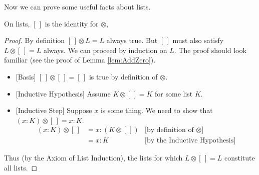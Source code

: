 \ipadbreak
Now we can prove some useful facts about lists.

\begin{lemma}
  On lists, $[\,]$ is the identity for $\otimes$,

\begin{proof}
  By definition
  $[\,]\otimes L = L$ always true.  But $[\,]$ must also 
  satisfy
  $L\otimes[\,] = L$ always. We can proceed by
  induction on $L$. The proof should look familiar (see the proof of
  Lemma \ref{lem:AddZero}).

  \begin{itemize}
  \item{}[Basis] $[\,]\otimes [\,] = [\,]$ is true by definition of
    $\otimes$.
  \item{}[Inductive Hypothesis] Assume $K\otimes[\,] = K$ for some list
    $K$.
  \item{}[Inductive Step]  Suppose $x$ is some thing. We need to show that $(x:K) \otimes [\,] = x:K$. 
    \begin{align*}
       (x:K)\otimes [\,] &= x:(K\otimes[\,]) &\text{[by definition of $\otimes$]}\\
	                   &= x:K &\text{[by the Inductive Hypothesis]}   	
    \end{align*}
  \end{itemize}
  Thus (by the Axiom of List Induction), the lists for which $L\otimes [\,] = L$ constitute all lists.
\end{proof}
\end{lemma}


\ipadbreak

